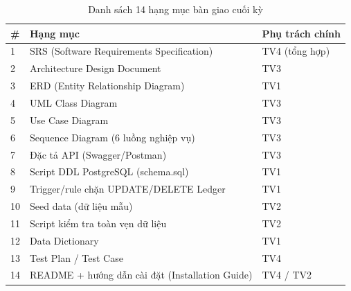 \begin{table}[htbp]
    \centering
    \small
    \caption{Danh sách 14 hạng mục bàn giao cuối kỳ}
    \begin{tabular}{|p{0.6cm}|p{7.5cm}|p{3.5cm}|}
        \hline
        \textbf{\#} & \textbf{Hạng mục} & \textbf{Phụ trách chính} \\
        \hline
        1 & SRS (Software Requirements Specification) & TV4 (tổng hợp) \\
        \hline
        2 & Architecture Design Document & TV3 \\
        \hline
        3 & ERD (Entity Relationship Diagram) & TV1 \\
        \hline
        4 & UML Class Diagram & TV3 \\
        \hline
        5 & Use Case Diagram & TV3 \\
        \hline
        6 & Sequence Diagram (6 luồng nghiệp vụ) & TV3 \\
        \hline
        7 & Đặc tả API (Swagger/Postman) & TV3 \\
        \hline
        8 & Script DDL PostgreSQL (schema.sql) & TV1 \\
        \hline
        9 & Trigger/rule chặn UPDATE/DELETE Ledger & TV1 \\
        \hline
        10 & Seed data (dữ liệu mẫu) & TV2 \\
        \hline
        11 & Script kiểm tra toàn vẹn dữ liệu & TV2 \\
        \hline
        12 & Data Dictionary & TV1 \\
        \hline
        13 & Test Plan / Test Case & TV4 \\
        \hline
        14 & README + hướng dẫn cài đặt (Installation Guide) & TV4 / TV2 \\
        \hline
    \end{tabular}
\end{table}
